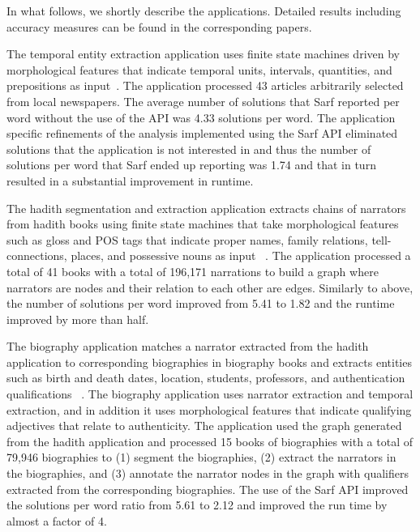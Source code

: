 In what follows, we shortly describe the applications. 
Detailed results including accuracy 
measures can be found in the corresponding papers. 

The temporal entity extraction application uses finite state machines driven by
morphological features that indicate temporal units, intervals, quantities, and
prepositions as input~\citep{ZaMa2012IJCLATime}.
The application processed 43 articles arbitrarily selected from local newspapers. 
The average number of solutions that Sarf reported per word without the use of the API
was 4.33 solutions per word. 
The application specific refinements of the analysis implemented using the
Sarf API eliminated solutions that the application is not 
interested in and thus the number of solutions per word that Sarf ended up
reporting was 1.74 and that in turn resulted in a substantial improvement in runtime. 

The hadith segmentation and extraction application extracts 
chains of narrators from hadith books using finite state machines that take 
morphological features such as gloss and POS tags that indicate proper names, 
family relations, tell-connections, places, and possessive nouns as input
~\citep{ZaMaFlairs2012HadithBio}.
The application processed a total of 41 books with a total of 196,171 narrations 
to build a graph where narrators are nodes and their relation to each other are edges. 
Similarly to above, the number of solutions per word improved from 5.41 to 1.82 
and the runtime improved by more than half. 

The biography application matches a narrator extracted from the hadith application 
to corresponding biographies in biography books and extracts entities such as 
birth and death dates, location, students, professors, and authentication 
qualifications
~\citep{ZaMaFlairs2012HadithBio}.
The biography application uses narrator extraction and temporal extraction, 
and in addition
it uses morphological features that indicate qualifying adjectives that relate 
to authenticity. 
The application used the graph generated from the hadith application and 
processed 15 books of biographies with a total of 79,946 biographies 
to (1) segment the biographies, (2) extract the narrators in the biographies, and 
(3) annotate the narrator nodes in the graph with qualifiers extracted from the 
corresponding biographies. 
The use of the Sarf API improved the solutions per word ratio from 5.61 to 2.12
and improved the run time by almost a factor of 4. 

